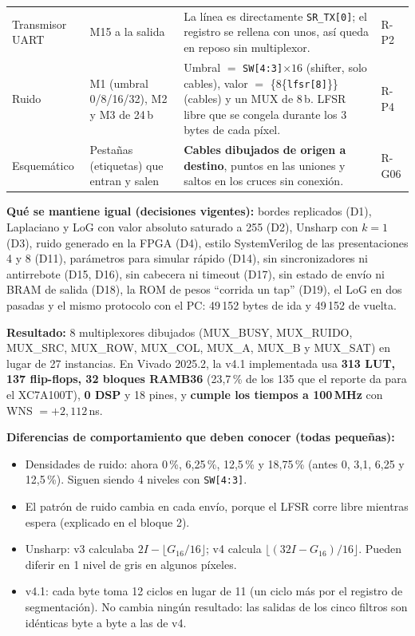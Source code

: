 \documentclass[11pt,a4paper]{article}
\newcommand{\bus}[1]{\texttt{#1}}
\begin{document}
\begin{center}
\begin{tabularx}{\linewidth}{>{\raggedright\arraybackslash}p{2.7cm}>{\raggedright\arraybackslash}X>{\raggedright\arraybackslash}X>{\raggedright\arraybackslash}p{1.6cm}}
Transmisor UART & M15 a la salida & La línea es directamente \bus{SR\_TX[0]}; el registro se rellena con unos, así queda en reposo sin multiplexor. & R-P2 \\
Ruido & M1 (umbral 0/8/16/32), M2 y M3 de 24\,b & Umbral $=$ \bus{SW[4:3]}$\times16$ (shifter, solo cables), valor $=$ \{8\{\bus{lfsr[8]}\}\} (cables) y un MUX de 8\,b. LFSR libre que se congela durante los 3 bytes de cada píxel. & R-P4 \\
Esquemático & Pestañas (etiquetas) que entran y salen & \textbf{Cables dibujados de origen a destino}, puntos en las uniones y saltos en los cruces sin conexión. & R-G06 \\
\bottomrule
\end{tabularx}
\end{center}

\textbf{Qué se mantiene igual (decisiones vigentes):} bordes replicados (D1), Laplaciano y LoG con valor absoluto saturado a 255 (D2), Unsharp con $k = 1$ (D3), ruido generado en la FPGA (D4), estilo SystemVerilog de las presentaciones 4 y 8 (D11), parámetros para simular rápido (D14), sin sincronizadores ni antirrebote (D15, D16), sin cabecera ni timeout (D17), sin estado de envío ni BRAM de salida (D18), la ROM de pesos ``corrida un tap'' (D19), el LoG en dos pasadas y el mismo protocolo con el PC: 49\,152 bytes de ida y 49\,152 de vuelta.

\textbf{Resultado:} 8 multiplexores dibujados (MUX\_BUSY, MUX\_RUIDO, MUX\_SRC, MUX\_ROW, MUX\_COL, MUX\_A, MUX\_B y MUX\_SAT) en lugar de 27 instancias. En Vivado 2025.2, la v4.1 implementada usa \textbf{313 LUT, 137 flip-flops, 32 bloques RAMB36} (23,7\,\% de los 135 que el reporte da para el XC7A100T), \textbf{0 DSP} y 18 pines, y \textbf{cumple los tiempos a 100\,MHz} con WNS $= +2{,}112$\,ns.

\begin{ojo}
\textbf{Diferencias de comportamiento que deben conocer (todas pequeñas):}
\begin{itemize}
\item Densidades de ruido: ahora 0\,\%, 6,25\,\%, 12,5\,\% y 18,75\,\% (antes 0, 3,1, 6,25 y 12,5\,\%). Siguen siendo 4 niveles con \bus{SW[4:3]}.
\item El patrón de ruido cambia en cada envío, porque el LFSR corre libre mientras espera (explicado en el bloque 2).
\item Unsharp: v3 calculaba $2I - \lfloor G_{16}/16\rfloor$; v4 calcula $\lfloor (32I - G_{16})/16 \rfloor$. Pueden diferir en 1 nivel de gris en algunos píxeles.
\item v4.1: cada byte toma 12 ciclos en lugar de 11 (un ciclo más por el registro de segmentación). No cambia ningún resultado: las salidas de los cinco filtros son idénticas byte a byte a las de v4.
\end{itemize}
\end{ojo}
\end{document}
